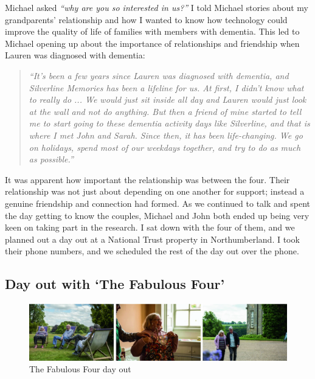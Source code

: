 Michael asked \textit{``why are you so interested in us?''} I told Michael stories about my grandparents' relationship and how I wanted to know how technology could improve the quality of life of families with members with dementia. This led to Michael  opening up about the importance of relationships and friendship when Lauren was diagnosed with dementia:

\begin{quote}
\textit{``It's been a few years since Lauren was diagnosed with dementia, and Silverline Memories has been a lifeline for us. At first, I didn't know what to really do ... We would just sit inside all day and Lauren would just look at the wall and not do anything. But then a friend of mine started to tell me to start going to these dementia activity days like Silverline, and that is where I met John and Sarah. Since then, it has been life-changing. We go on holidays, spend most of our weekdays together, and try to do as much as possible.''
}    
\end{quote}

It was apparent how important the relationship was between the four. Their relationship was not just about depending on one another for support; instead a genuine friendship and connection had formed. As we continued to talk and spent the day getting to know the couples, Michael and John both ended up being very keen on taking part in the research. I sat down with the four of them, and we planned out a day out at a National Trust property in Northumberland. I took their phone numbers, and we scheduled the rest of the day out over the phone.

\subsection{Day out with `The Fabulous Four'}
\label{DayOutOne}

\begin{figure}[htp]
\centering
\includegraphics[width=1\linewidth]{Images/ChapterFour/FamilyDayOut.png}
\caption{The Fabulous Four day out}
\label{fig:DayOut}
\end{figure}

